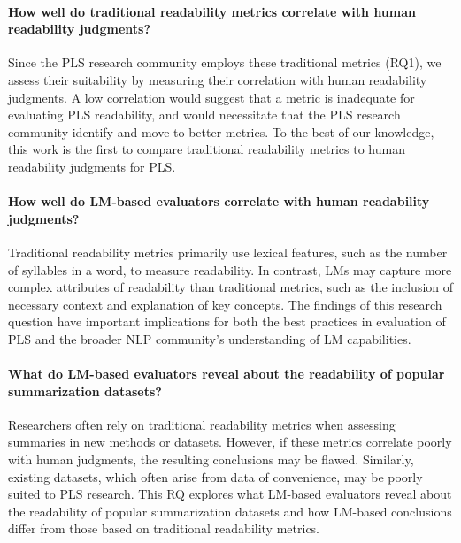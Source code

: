 \paragraph{{\rqtwo\label{rq2}}How well do traditional readability metrics correlate with human readability judgments?} Since the PLS research community employs these traditional metrics (RQ1), we assess their suitability by measuring their correlation with human readability judgments. A low correlation would suggest that a metric is inadequate for evaluating PLS readability, and would necessitate that the PLS research community identify and move to better metrics. To the best of our knowledge, this work is the first to compare traditional readability metrics to human readability judgments for PLS.

\paragraph{{\rqthree\label{rq3}}How well do LM-based evaluators correlate with human readability judgments?} Traditional readability metrics primarily use lexical features, such as the number of syllables in a word, to measure readability. In contrast, LMs may capture more complex attributes of readability than traditional metrics, such as the inclusion of necessary context and explanation of key concepts. The findings of this research question have important implications for both the best practices in evaluation of PLS and the broader NLP community's understanding of LM capabilities.

\paragraph{{\rqfour\label{rq4}} What do LM-based evaluators reveal about the readability of popular summarization datasets?} Researchers often rely on traditional readability metrics when assessing summaries in new methods or datasets. However, if these metrics correlate poorly with human judgments, the resulting conclusions may be flawed. Similarly, existing datasets, which often arise from data of convenience, may be poorly suited to PLS research. This RQ explores what LM-based evaluators reveal about the readability of popular summarization datasets and how LM-based conclusions differ from those based on traditional readability metrics. 

